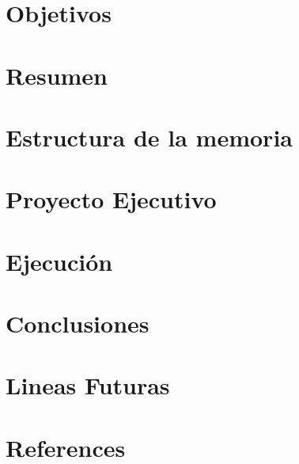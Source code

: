 \documentclass[12pt,a4paper]{article}
\begin{document}
    
%	
    
    \glsaddall
    \printnoidxglossary[style=tree,title=Glosario,nonumberlist]\label{sec:glossary}

    \newpage
    \section{Objetivos}\label{sec:objetivos}
    

    \newpage
    \section{Resumen}\label{sec:introduccion}
    

    \newpage
    \section{Estructura de la memoria}\label{sec:estructura}
    

    \newpage
    \section{Proyecto Ejecutivo}\label{sec:proyecto_ejecutivo}
    

    \newpage
    \section{Ejecución}\label{sec:ejecucion}
    
%		

    \newpage
    \section{Conclusiones}\label{sec:conclusiones}
    


    \section{Lineas Futuras}\label{sec:lineas_futuras}
    
    \newpage


    \section{References}\label{sec:references}
\end{document}
